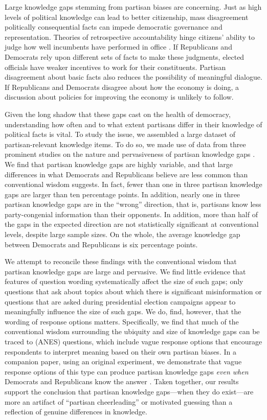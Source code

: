 \documentclass[12pt, letterpaper]{article}
\begin{document}
Large knowledge gaps stemming from partisan biases are concerning. Just as high levels of political knowledge can lead to better citizenship, mass disagreement politically consequential facts can impede democratic governance and representation. Theories of retrospective accountability hinge citizens' ability to judge how well incumbents have performed in office  \citep{fiorina1981retrospective,Key1966,kramer_1971}. If Republicans and Democrats rely upon different sets of facts to make these judgments, elected officials have weaker incentives to work for their constituents. Partisan disagreement about basic facts also reduces the possibility of meaningful dialogue. If Republicans and Democrats disagree about how the economy is doing, a discussion about policies for improving the economy is unlikely to follow. 

Given the long shadow that these gaps cast on the health of democracy, understanding how often and to what extent partisans differ in their knowledge of political facts is vital. To study the issue, we assembled a large dataset of partisan-relevant knowledge items. To do so, we made use of data from three prominent studies on the nature and pervasiveness of partisan knowledge gaps \citep{bullocketal_2015,jerit2012partisan,prior2015you}. We find that partisan knowledge gaps are highly variable, and that large differences in what Democrats and Republicans believe are less common than conventional wisdom suggests. In fact, fewer than one in three partisan knowledge gaps are larger than ten percentage points. In addition, nearly one in three partisan knowledge gaps are in the ``wrong'' direction, that is, partisans know less party-congenial information than their opponents. In addition, more than half of the gaps in the expected direction are not statistically significant at conventional levels, despite large sample sizes. On the whole, the average knowledge gap between Democrats and Republicans is six percentage points.

We attempt to reconcile these findings with the conventional wisdom that partisan knowledge gaps are large and pervasive. We find little evidence that features of question wording systematically affect the size of such gaps; only questions that ask about topics about which there is significant misinformation or questions that are asked during presidential election campaigns appear to meaningfully influence the size of such gaps. We do, find, however, that the wording of response options matters. Specifically, we find that much of the conventional wisdom surrounding the ubiquity and size of knowledge gaps can be traced to  \citet{anes_gen} (ANES) questions, which include vague response options that encourage respondents to interpret meaning based on their own partisan biases. In a companion paper, using an original experiment, we demonstrate that vague response options of this type can produce partisan knowledge gaps \textit{even when} Democrats and Republicans know the answer \citep{roush_2021}. Taken together, our results support the conclusion that partisan knowledge gaps---when they do exist---are more an artifact of ``partisan cheerleading'' \citep{bullocketal_2015,prior2015you} or motivated guessing than a reflection of genuine differences in knowledge.
\end{document}
